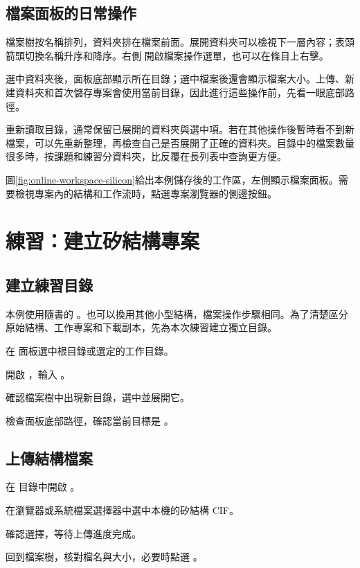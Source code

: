 \subsection{檔案面板的日常操作}

檔案樹按名稱排列，資料夾排在檔案前面。展開資料夾可以檢視下一層內容；表頭箭頭切換名稱升序和降序。右側  開啟檔案操作選單，也可以在條目上右擊。

選中資料夾後，面板底部顯示所在目錄；選中檔案後還會顯示檔案大小。上傳、新建資料夾和首次儲存專案會使用當前目錄，因此進行這些操作前，先看一眼底部路徑。

 重新讀取目錄，通常保留已展開的資料夾與選中項。若在其他操作後暫時看不到新檔案，可以先重新整理，再檢查自己是否展開了正確的資料夾。目錄中的檔案數量很多時，按課題和練習分資料夾，比反覆在長列表中查詢更方便。

圖\ref{fig:online-workspace-silicon}給出本例儲存後的工作區，左側顯示檔案面板。需要檢視專案內的結構和工作流時，點選專案瀏覽器的側邊按鈕。

\section{練習：建立矽結構專案}

\subsection{建立練習目錄}

本例使用隨書的 。也可以換用其他小型結構，檔案操作步驟相同。為了清楚區分原始結構、工作專案和下載副本，先為本次練習建立獨立目錄。

\begin{steps}
\item 在  面板選中根目錄或選定的工作目錄。
\item 開啟 ，輸入 。
\item 確認檔案樹中出現新目錄，選中並展開它。
\item 檢查面板底部路徑，確認當前目標是 。
\end{steps}

\subsection{上傳結構檔案}

\begin{steps}
\item 在  目錄中開啟 。
\item 在瀏覽器或系統檔案選擇器中選中本機的矽結構 CIF。
\item 確認選擇，等待上傳進度完成。
\item 回到檔案樹，核對檔名與大小，必要時點選 。
\end{steps}

